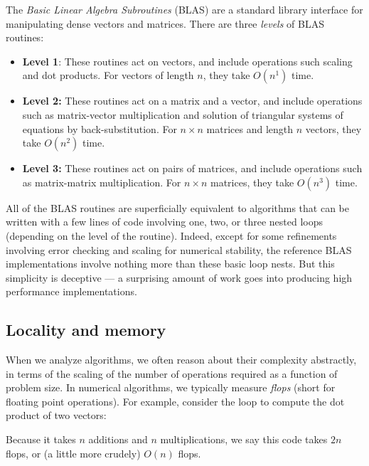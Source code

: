 \documentclass[12pt, leqno]{article} %
\begin{document}
The {\em Basic Linear Algebra Subroutines} (BLAS) are a standard library
interface for manipulating dense vectors and matrices.  There are three
{\em levels} of BLAS routines:
\begin{itemize}
\item {\bf Level 1}:
  These routines act on vectors, and include operations
  such scaling and dot products.  For vectors of length $n$,
  they take $O(n^1)$ time.
\item {\bf Level 2:}
  These routines act on a matrix and a vector, and include operations
  such as matrix-vector multiplication and solution of triangular systems
  of equations by back-substitution.  For $n \times n$ matrices and length
  $n$ vectors, they take $O(n^2)$ time.
\item {\bf Level 3:}
  These routines act on pairs of matrices, and include operations such
  as matrix-matrix multiplication.  For $n \times n$ matrices, they
  take $O(n^3)$ time.
\end{itemize}
All of the BLAS routines are superficially equivalent to algorithms
that can be written with a few lines of code involving one, two, or
three nested loops (depending on the level of the routine).  Indeed,
except for some refinements involving error checking and scaling for
numerical stability, the reference BLAS implementations involve
nothing more than these basic loop nests.  But this simplicity is
deceptive --- a surprising amount of work goes into producing high
performance implementations.

\subsection{Locality and memory}

When we analyze algorithms, we often reason about their complexity
abstractly, in terms of the scaling of the number of operations required
as a function of problem size.  In numerical algorithms, we typically
measure {\em flops} (short for floating point operations).  For example,
consider the loop to compute the dot product of two vectors:

Because it takes $n$ additions and $n$ multiplications, we say this code
takes $2n$ flops, or (a little more crudely) $O(n)$ flops.
\end{document}
